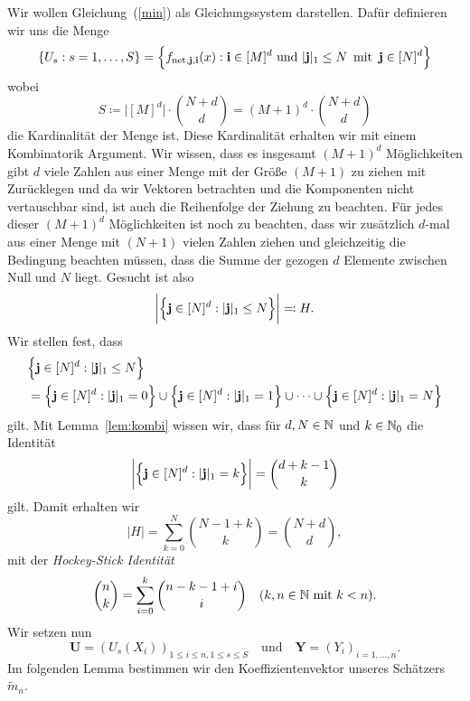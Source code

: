 Wir wollen Gleichung~(\ref{min}) als Gleichungssystem darstellen. Dafür definieren wir uns die Menge 
\begin{align*} 
\{U_s : s = 1,\dots,S\} = \Bigl\{f_{\mathrm{net},\mathbf{j},\mathbf{i}}(x) : \mathbf{i} \in [M]^d \text{ und } |\mathbf{j}|_1 \leq N \, \text{ mit }\, \mathbf{j} \in [N]^d \Bigr\}
\end{align*}
wobei
$$ S \coloneqq \big|[M]^d\big| \cdot  \binom{N + d}{d} = (M + 1)^d \cdot \binom{N + d}{d}$$ die Kardinalität der Menge ist.
Diese Kardinalität erhalten wir mit einem Kombinatorik Argument.
Wir wissen, dass es insgesamt $(M + 1)^d$ Möglichkeiten gibt $d$ viele Zahlen aus einer Menge mit der Größe $(M + 1)$ zu ziehen mit Zurücklegen und da wir Vektoren betrachten und die Komponenten nicht vertauschbar sind, ist auch die Reihenfolge der Ziehung zu beachten.
Für jedes dieser $(M + 1)^d$ Möglichkeiten ist noch zu beachten, dass wir zusätzlich $d$-mal aus einer Menge mit $(N + 1)$ vielen Zahlen ziehen und gleichzeitig die Bedingung beachten müssen, dass die Summe der gezogen $d$ Elemente zwischen Null und $N$ liegt.
Gesucht ist also 
$$\bigg|\Bigl\{\mathbf{j} \in [N]^d : |\mathbf{j}|_1 \leq N \Bigr\}\bigg| \eqqcolon H.$$ 
Wir stellen fest, dass
\begin{equation*}
\begin{split}
& \Bigl\{\mathbf{j} \in [N]^d : |\mathbf{j}|_1 \leq N \Bigr\} \\
& = \Bigl\{\mathbf{j} \in [N]^d : |\mathbf{j}|_1 = 0 \Bigr\}
 \cup \Bigl\{\mathbf{j} \in [N]^d : |\mathbf{j}|_1 = 1 \Bigr\}
 \cup \dots 
 \cup \Bigl\{\mathbf{j} \in [N]^d : |\mathbf{j}|_1 = N\Bigr\}
\end{split}
\end{equation*}
gilt. Mit Lemma~\ref{lem:kombi} wissen wir, dass für $d, N \in \mathbb{N}$ und $k \in \mathbb{N}_0$ die Identität
$$\bigg|\Bigl\{\mathbf{j} \in [N]^d : |\mathbf{j}|_1 = k \Bigr\}\bigg| = \binom{d + k - 1}{k}$$ gilt.
Damit erhalten wir
$$|H| = \sum_{k = 0}^N \binom{N - 1 + k}{k} = \binom{N + d}{d},$$
mit der \emph{Hockey-Stick Identität}
$$\binom{n}{k} = \sum_{i = 0}^k \binom{n - k - 1 + i}{i} \quad (k, n \in \mathbb{N}  \text{ mit  } k < n).$$
Wir setzen nun 
$$ \mathbf{U} = (U_s(X_i))_{1\leq i \leq n,1\leq s \leq S} \quad \text{und} \quad \mathbf{Y} = (Y_i)_{i = 1,\dots,n}.$$
Im folgenden Lemma bestimmen wir den Koeffizientenvektor unseres Schätzers $\tilde{m}_n$.
